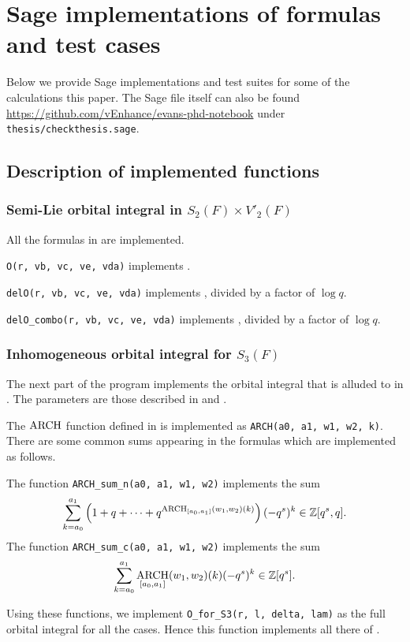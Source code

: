 \chapter{Sage implementations of formulas and test cases}
Below we provide Sage implementations and test suites
for some of the calculations this paper.
The Sage file itself can also be found
\url{https://github.com/vEnhance/evans-phd-notebook}
under \texttt{thesis/checkthesis.sage}.

\section{Description of implemented functions}
\subsection{Semi-Lie orbital integral in $S_2(F) \times V'_2(F)$}
All the formulas in  are implemented.
\begin{itemize}
  \ii \texttt{O(r, vb, vc, ve, vda)}
  implements .

  \ii \texttt{delO(r, vb, vc, ve, vda)}
  implements ,
  divided by a factor of $\log q$.

  \ii \texttt{delO\_combo(r, vb, vc, ve, vda)}
  implements ,
  divided by a factor of $\log q$.
\end{itemize}

\subsection{Inhomogeneous orbital integral for $S_3(F)$}
The next part of the program implements the orbital integral
that is alluded to in .
The parameters are those described in  and .
\begin{itemize}
  \ii The $\operatorname*{ARCH}$ function defined in  is implemented
  as \texttt{ARCH(a0, a1, w1, w2, k)}.
  \ii There are some common sums appearing in the formulas
  which are implemented as follows.
  \begin{itemize}
    \ii The function \texttt{ARCH\_sum\_n(a0, a1, w1, w2)} implements the sum
    \[ \sum_{k=a_0}^{a_1} \left( 1 + q + \dots
      + q^{\operatorname*{ARCH}_{[a_0, a_1]}(w_1, w_2)(k)} \right) (-q^s)^k \in \mathbb Z[q^s, q]. \]
    \ii The function \texttt{ARCH\_sum\_c(a0, a1, w1, w2)} implements the sum
    \[ \sum_{k=a_0}^{a_1} \operatorname*{ARCH}_{[a_0, a_1]}(w_1, w_2)(k) (-q^s)^k \in \mathbb Z[q^s]. \]
  \end{itemize}
  \ii Using these functions, we implement \texttt{O\_for\_S3(r, l, delta, lam)}
  as the full orbital integral for all the cases.
  Hence this function implements all there of
  .
\end{itemize}

